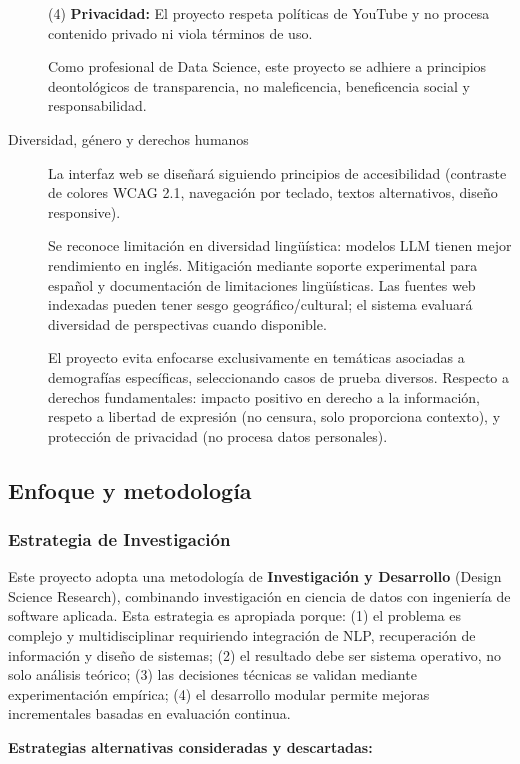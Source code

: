 \documentclass[12pt,a4paper,twoside]{book}
\begin{document}
\begin{description}
    (4) \textbf{Privacidad:} El proyecto respeta políticas de YouTube y no procesa contenido privado ni viola términos de uso.

    Como profesional de Data Science, este proyecto se adhiere a principios deontológicos de transparencia, no maleficencia, beneficencia social y responsabilidad.

    \item[Diversidad, género y derechos humanos] La interfaz web se diseñará siguiendo principios de accesibilidad (contraste de colores WCAG 2.1, navegación por teclado, textos alternativos, diseño responsive).

    Se reconoce limitación en diversidad lingüística: modelos LLM tienen mejor rendimiento en inglés. Mitigación mediante soporte experimental para español y documentación de limitaciones lingüísticas. Las fuentes web indexadas pueden tener sesgo geográfico/cultural; el sistema evaluará diversidad de perspectivas cuando disponible.

    El proyecto evita enfocarse exclusivamente en temáticas asociadas a demografías específicas, seleccionando casos de prueba diversos. Respecto a derechos fundamentales: impacto positivo en derecho a la información, respeto a libertad de expresión (no censura, solo proporciona contexto), y protección de privacidad (no procesa datos personales).
\end{description}

\subsection{Enfoque y metodología}

\subsubsection{Estrategia de Investigación}

Este proyecto adopta una metodología de \textbf{Investigación y Desarrollo} (Design Science Research), combinando investigación en ciencia de datos con ingeniería de software aplicada. Esta estrategia es apropiada porque: (1) el problema es complejo y multidisciplinar requiriendo integración de NLP, recuperación de información y diseño de sistemas; (2) el resultado debe ser sistema operativo, no solo análisis teórico; (3) las decisiones técnicas se validan mediante experimentación empírica; (4) el desarrollo modular permite mejoras incrementales basadas en evaluación continua.

\textbf{Estrategias alternativas consideradas y descartadas:}
\end{document}
